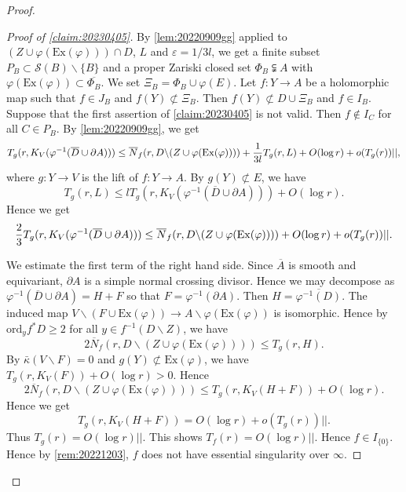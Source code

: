 \documentclass[11pt,english]{smfart}
\theoremstyle{plain}
\theoremstyle{definition}
\theoremstyle{remark}
\numberwithin{equation}{section}
\theoremstyle{plain}
\begin{document}
\begin{proof}
\begin{proof}[Proof of \cref{claim:20230405}]
			
			
			By \cref{lem:20220909gg} applied to $(Z\cup \varphi (\mathrm{Ex}(\varphi)))\cap D$, $L$ and $\varepsilon=1/3l$, we get a finite subset $P_B\subset \mathcal{S}(B)\backslash\{B\}$ and a proper Zariski closed set $\Phi_B\subsetneqq A$ with $\varphi (\mathrm{Ex}(\varphi))\subset \overline{\Phi_B}$.
			We set $\Xi_B=\Phi_B\cup\varphi(E)$.
			Let $f:Y\to A$ be a holomorphic map such that $f\in J_B$ and $f(Y)\not\subset \Xi_B$.
			Then $ f(Y)\not\subset D\cup \Xi_B$ and $f\in I_B$.
			Suppose that the first assertion of \cref{claim:20230405} is not valid.
			Then $f\not\in I_C$ for all $C\in P_B$.
			By \cref{lem:20220909gg}, we get
			\begin{equation*}
				T_{g}(r,K_{V}(\varphi^{-1}(\overline{D}\cup \partial A)))
				\leq \overline{N}_{f}(r,D\backslash (Z\cup \varphi (\mathrm{Ex}(\varphi))))+\frac{1}{3l}T_{g}(r,L)
				\\
				+O(\log r)+o(T_{g}(r))||,
			\end{equation*}
			where $g:Y\to V$ is the lift of $ f:Y\to A$.
			By $g(Y)\not\subset E$, we have 
			$$
			T_{g}(r,L)\leq lT_{g}(r,K_{V}(\varphi^{-1}(\overline{D}\cup \partial A)))+O(\log r).
			$$
			Hence we get
			\begin{equation*}
				\frac{2}{3}T_{g}(r,K_{V}(\varphi^{-1}(\overline{D}\cup \partial A)))
				\leq \overline{N}_{f}(r,D\backslash (Z\cup \varphi (\mathrm{Ex}(\varphi))))
				\\
				+O(\log r)+o(T_{g}(r))||.
			\end{equation*}
			
			
			We estimate the first term of the right hand side.
			Since $\overline{A}$ is smooth and equivariant, $\partial A$ is a simple normal crossing divisor.
			Hence we may decompose as $\varphi^{-1}(\overline{D}\cup \partial A)=H+F$ so that $F=\varphi^{-1}(\partial A)$.
			Then $H=\overline{\varphi^{-1}(D)}$.
			The induced map $V\backslash (F\cup \mathrm{Ex}(\varphi))\to A\backslash \varphi(\mathrm{Ex}(\varphi))$ is isomorphic.
			Hence by $\mathrm{ord}_yf^*D\geq 2$ for all $y\in f^{-1}(D\backslash Z)$, we have
			$$
			2\overline{N}_{f}(r,D\backslash (Z\cup \varphi (\mathrm{Ex}(\varphi))))\leq T_g(r,H).
			$$
			By $\bar{\kappa}(V\backslash F)=0$ and $g(Y)\not\subset \mathrm{Ex}(\varphi)$, we have $T_g(r,K_V(F))+O(\log r)>0$.
			Hence
			$$
			2\overline{N}_{f}(r,D\backslash (Z\cup \varphi (\mathrm{Ex}(\varphi))))\leq T_g(r,K_V(H+F))+O(\log r).
			$$
			Hence we get
			$$
			T_{g}(r,K_{V}(H+F))=O(\log r)+o(T_{g}(r))||.
			$$ 	 	
			Thus $T_{g}(r)=O(\log r) ||$.
			This shows $T_{f}(r)=O(\log r) ||$. 
			Hence $f\in I_{\{0\}}$.
			Hence by \cref{rem:20221203}, $f$ does not have essential singularity over $\infty$.
		\end{proof}
		

\end{proof}
\end{document}

